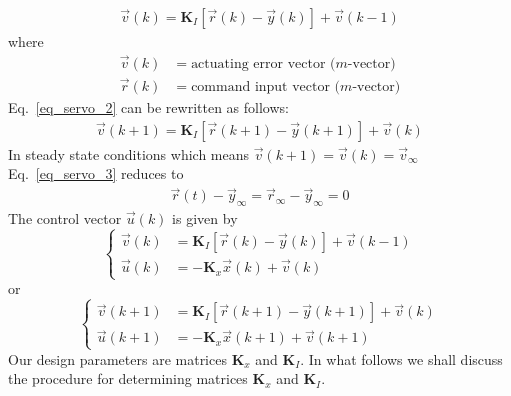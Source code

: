 \documentclass[12pt,a4paper,oneside]{book}
\begin{document}
\begin{onehalfspace}
\begin{equation}
\begin{aligned}
		\vec{v}(k) = \mathbf{K}_I\left[ 
		\vec{r}(k)-\vec{y}(k)\right]+\vec{v}(k-1) 
	\end{aligned}
\end{equation}
where 
\begin{equation}
	\begin{aligned}
		\vec{v}(k) &= \text{actuating error vector ($m$-vector)}\\[6pt]
		\vec{r}(k) &= \text{command input vector ($m$-vector)}
	\end{aligned}
\end{equation}
Eq.~\eqref{eq_servo_2} can be rewritten as follows:
\begin{equation}\label{eq_servo_3}
	\begin{aligned}
		\vec{v}(k+1) = \mathbf{K}_I\left[ 
		\vec{r}(k+1)-\vec{y}(k+1)\right]+\vec{v}(k) 
	\end{aligned}
\end{equation}
In steady state conditions which means 
$\vec{v}(k+1)=\vec{v}(k)=\vec{v}_{\infty}$ Eq.~\eqref{eq_servo_3} reduces to 
\begin{equation}\label{eq_servo_4}
	\begin{aligned}
		\vec{r}(t) - \vec{y}_{\infty} =\vec{r}_{\infty} - \vec{y}_{\infty} = 0
	\end{aligned}
\end{equation}
The control vector $\vec{u}(k)$ is given by 
\begin{equation}
	\left\lbrace 
	\begin{aligned}
		\vec{v}(k) &= \mathbf{K}_I\left[ 
		\vec{r}(k)-\vec{y}(k)\right]+\vec{v}(k-1) \\[6pt]
		\vec{u}(k) &= -\mathbf{K}_x\vec{x}(k)+\vec{v}(k) 
	\end{aligned}
	\right. 
\end{equation}
or
\begin{equation}\label{eq_servo_5}
	\left\lbrace 
	\begin{aligned}
		\vec{v}(k+1) &= \mathbf{K}_I\left[ 
		\vec{r}(k+1)-\vec{y}(k+1)\right]+\vec{v}(k) \\[6pt]
		\vec{u}(k+1) &= -\mathbf{K}_x\vec{x}(k+1)+\vec{v}(k+1) 
	\end{aligned}
	\right. 
\end{equation}
Our design parameters are matrices $\mathbf{K}_x$ and $\mathbf{K}_I$.
In what follows we shall discuss the procedure for determining matrices 
$\mathbf{K}_x$ and $\mathbf{K}_I$.


\end{onehalfspace}
\end{document}
